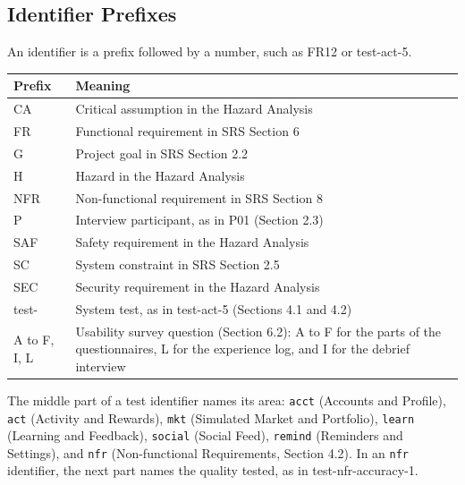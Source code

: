 \documentclass[12pt, titlepage]{article}
\begin{document}
\bigskip
\noindent\begin{minipage}{\textwidth}
\subsection*{Identifier Prefixes}

An identifier is a prefix followed by a number, such as FR12 or test-act-5.

\smallskip
\begin{tabularx}{\textwidth}{l X}
  \toprule
  \textbf{Prefix} & \textbf{Meaning}\\
  \midrule
  CA & Critical assumption in the Hazard Analysis\\
  FR & Functional requirement in SRS Section 6\\
  G & Project goal in SRS Section 2.2\\
  H & Hazard in the Hazard Analysis\\
  NFR & Non-functional requirement in SRS Section 8\\
  P & Interview participant, as in P01 (Section 2.3)\\
  SAF & Safety requirement in the Hazard Analysis\\
  SC & System constraint in SRS Section 2.5\\
  SEC & Security requirement in the Hazard Analysis\\
  test- & System test, as in test-act-5 (Sections 4.1 and 4.2)\\
  A to F, I, L & Usability survey question (Section 6.2): A to F for the parts
    of the questionnaires, L for the experience log, and I for the debrief
    interview\\
  \bottomrule
\end{tabularx}
\end{minipage}

\medskip
\noindent The middle part of a test identifier names its area: \texttt{acct}
(Accounts and Profile), \texttt{act} (Activity and Rewards), \texttt{mkt}
(Simulated Market and Portfolio), \texttt{learn} (Learning and Feedback),
\texttt{social} (Social Feed), \texttt{remind} (Reminders and Settings), and
\texttt{nfr} (Non-functional Requirements, Section 4.2). In an \texttt{nfr}
identifier, the next part names the quality tested, as in test-nfr-accuracy-1.
\end{document}
